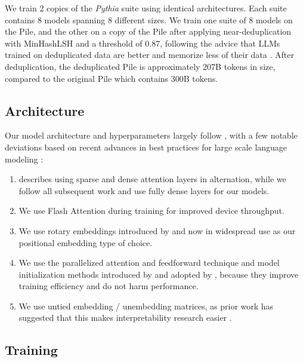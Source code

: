 We train 2 copies of the \textit{Pythia} suite using identical architectures. Each suite contains 8 models spanning 8 different sizes. We train one suite of 8 models on the Pile, and the other on a copy of the Pile after applying near-deduplication with MinHashLSH and a threshold of 0.87, following the advice that LLMs trained on deduplicated data are better and memorize less of their data \citep{Lee2021DeduplicatingTD}. After deduplication, the deduplicated Pile is approximately 207B tokens in size, compared to the original Pile which contains 300B tokens.

\subsection{Architecture}

Our model architecture and hyperparameters largely follow \citet{brown2020language}, with a few notable deviations based on recent advances in best practices for large scale language modeling \citep{black2022gpt,chowdhery2022palm,zeng2022glm}:

\begin{enumerate}
    \item \citet{brown2020language} describes using sparse and dense attention layers in alternation, while we follow all subsequent work and use fully dense layers for our models.
    \item We use Flash Attention \citep{dao2022flashattention} during training for improved device throughput.
    \item We use rotary embeddings introduced by \citet{su2021roformer} and now in widespread use \citep{black2022gpt,chowdhery2022palm,zeng2022glm} as our positional embedding type of choice.
    \item We use the parallelized attention and feedforward technique and model initialization methods introduced by \citet{gpt-j} and adopted by \citep{black2022gpt,chowdhery2022palm}, because they improve training efficiency and do not harm performance.
    \item We use untied embedding / unembedding matrices, as prior work has suggested that this makes interpretability research easier \citep{belrose2023eliciting}.
\end{enumerate}

\subsection{Training}

